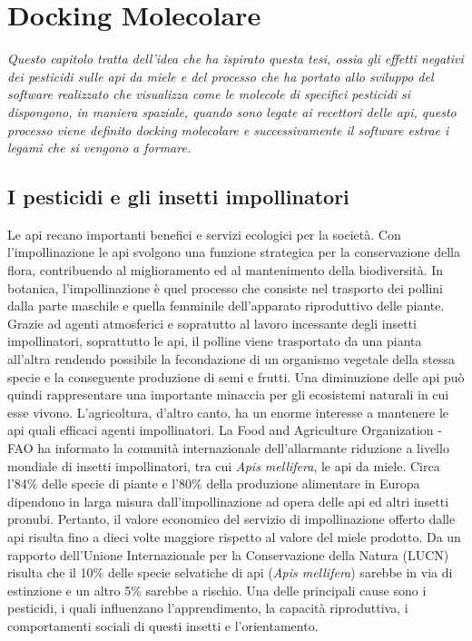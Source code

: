 \chapter{Docking Molecolare}
\textit{Questo capitolo tratta dell'idea che ha ispirato questa tesi, ossia gli effetti negativi dei pesticidi sulle api da miele e del processo che ha portato allo sviluppo del software realizzato che visualizza come le molecole di specifici pesticidi si dispongono, in maniera spaziale, quando sono legate ai recettori delle api, questo processo viene definito docking molecolare e successivamente il software estrae i legami che si vengono a formare.}

\vskip 1cm

\section{I pesticidi e gli insetti impollinatori}
Le api recano importanti benefici e servizi ecologici per la società. Con l’impollinazione le api svolgono una funzione strategica per la conservazione della flora, contribuendo al miglioramento ed al mantenimento della biodiversità.\newline
In botanica, l’impollinazione è quel processo che consiste nel trasporto dei pollini dalla parte maschile e quella femminile dell’apparato riproduttivo delle piante. Grazie ad agenti atmosferici e sopratutto al lavoro incessante degli insetti impollinatori, soprattutto le api, il polline viene trasportato da una pianta all’altra rendendo possibile la fecondazione di un organismo vegetale della stessa specie e la conseguente produzione di semi e frutti. Una diminuzione delle api può quindi rappresentare una importante minaccia per gli ecosistemi naturali in cui esse vivono. L’agricoltura, d’altro canto, ha un enorme interesse a mantenere le api quali efficaci agenti impollinatori. La Food and Agriculture Organization - FAO ha informato la comunità internazionale dell’allarmante riduzione a livello mondiale di insetti impollinatori, tra cui \textit{Apis mellifera}, le api da miele. Circa l’84\% delle specie di piante e l’80\% della produzione alimentare in Europa dipendono in larga misura dall’impollinazione ad opera delle api ed altri insetti pronubi\cite{bellucciapi}. Pertanto, il valore economico del servizio di impollinazione offerto dalle api risulta fino a dieci volte maggiore rispetto al valore del miele prodotto.\newline 
Da un rapporto dell’Unione Internazionale per la Conservazione della Natura (LUCN) risulta che il 10\% delle specie selvatiche di api (\textit{Apis mellifera}) sarebbe in via di estinzione e un altro 5\% sarebbe a rischio. Una delle principali cause sono i pesticidi, i quali influenzano l’apprendimento, la capacità riproduttiva, i comportamenti sociali di questi insetti e l'orientamento. \newline
